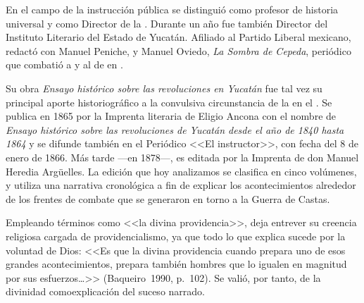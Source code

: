 En el campo de la instrucción pública se distinguió como
profesor de historia universal y como Director de
la \href{http://es.wikipedia.org/w/index.php?title=Escuela_Normal_de_Profesores_de_Yucatán&action=edit&redlink=1}{}. Durante un año fue
también Director del Instituto Literario del Estado de Yucatán. Afiliado al
Partido Liberal mexicano, redactó con Manuel
Peniche, \href{http://es.wikipedia.org/wiki/Eligio_Ancona}{} y Manuel
Oviedo, \textit{La Sombra de Cepeda},
periódico que combatió a \href{http://es.wikipedia.org/wiki/Segunda_Intervención_Francesa_en_México}{} y al \href{http://es.wikipedia.org/wiki/Segundo_Imperio_Mexicano}{} de
\href{http://es.wikipedia.org/wiki/Maximiliano_I_de_México}{} {en} \href{http://es.wikipedia.org/wiki/México}{}.

Su obra \textit{Ensayo histórico sobre las revoluciones en
Yucatán} fue tal vez su principal aporte historiográfico a la
convulsiva circunstancia de la \href{http://es.wikipedia.org/wiki/Península_de_Yucatán}{\textstyleInternetLink{\textcolor[rgb]{0.0,0.0,0.039215688}{península
de Yucatán}}} en el \href{http://es.wikipedia.org/wiki/Siglo_XIX}{\textstyleInternetLink{\textcolor[rgb]{0.0,0.0,0.039215688}{siglo
XIX}}}. Se  publica en 1865 por la Imprenta literaria de Eligio Ancona con
el nombre de \textit{Ensayo histórico sobre las revoluciones de Yucatán
desde el año de 1840 hasta 1864} y se difunde también en el Periódico <<El
instructor>>, con fecha del 8 de enero de 1866. Más tarde ---en 1878---, es
editada  por  la Imprenta de don Manuel Heredia Argüelles. La edición que
hoy analizamos se clasifica en cinco volúmenes, y utiliza una narrativa
cronológica  a fin de explicar los acontecimientos alrededor de los frentes
de combate que se generaron en torno a la Guerra de Castas.


Empleando términos como <<la divina providencia>>, deja entrever su creencia
religiosa cargada de providencialismo, ya que todo lo que explica sucede
por la voluntad de Dios: <<Es que la divina providencia  cuando prepara uno
de esos grandes acontecimientos, prepara también hombres que lo igualen en
magnitud por sus esfuerzos\ldots>> (Baqueiro~1990, p.~102). Se valió, por tanto, 
de la divinidad como\linebreak explicación del suceso narrado.


